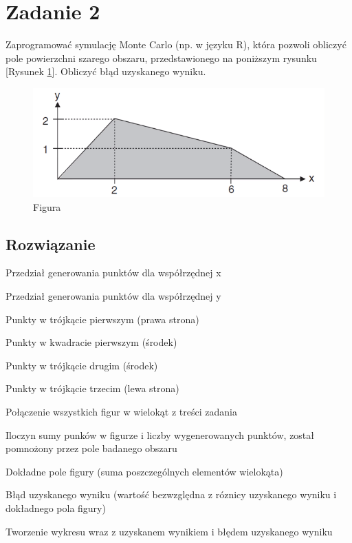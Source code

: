 \documentclass[a4paper,11pt,titlepage]{article}
\begin{document}
\newpage
\section{Zadanie 2}
Zaprogramować symulację Monte Carlo (np. w języku R), która pozwoli obliczyć pole powierzchni szarego obszaru, przedstawionego na poniższym rysunku [Rysunek \ref{fig:wykres2}]. Obliczyć błąd uzyskanego wyniku.

\begin{figure}[H]
\centering
\includegraphics[width=1\columnwidth]{img/zad2.PNG}
\caption{Figura}
\label{fig:wykres2}
\end{figure}

\subsection{Rozwiązanie}
Przedział generowania punktów dla współrzędnej x

Przedział generowania punktów dla współrzędnej y

Punkty w trójkącie pierwszym (prawa strona)

Punkty w kwadracie pierwszym (środek)

Punkty w trójkącie drugim (środek)

Punkty w trójkącie trzecim (lewa strona)

Połączenie wszystkich figur w wielokąt z treści zadania

Iloczyn sumy punków w figurze i liczby wygenerowanych punktów, został pomnożony przez pole badanego obszaru

Dokładne pole figury (suma poszczególnych elementów wielokąta)

Błąd uzyskanego wyniku (wartość bezwzględna z róznicy uzyskanego wyniku i dokładnego pola figury)

Tworzenie wykresu wraz z uzyskanem wynikiem i błędem uzyskanego wyniku
\end{document}
